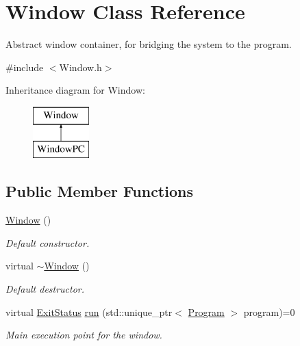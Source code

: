 \hypertarget{class_window}{}\section{Window Class Reference}
\label{class_window}


Abstract window container, for bridging the system to the program.  




{\ttfamily \#include $<$Window.\+h$>$}

Inheritance diagram for Window\+:\begin{figure}[H]
\begin{center}
\leavevmode
\includegraphics[height=2.000000cm]{class_window}
\end{center}
\end{figure}
\subsection*{Public Member Functions}
\begin{DoxyCompactItemize}
\item 
\hyperlink{class_window_a74e6087da23d3c24e9fac0245e5ec92c}{Window} ()
\begin{DoxyCompactList}\small\item\em Default constructor. \end{DoxyCompactList}\item 
virtual \hyperlink{class_window_a245d821e6016fa1f6970ccbbedd635f6}{$\sim$\+Window} ()
\begin{DoxyCompactList}\small\item\em Default destructor. \end{DoxyCompactList}\item 
virtual \hyperlink{_window_8h_ae189a3c432aa37137a55df8c91c579ed}{Exit\+Status} \hyperlink{class_window_ad98ff66251be5270bdf3fe2e731dec0b}{run} (std\+::unique\+\_\+ptr$<$ \hyperlink{class_program}{Program} $>$ program)=0
\begin{DoxyCompactList}\small\item\em Main execution point for the window. \end{DoxyCompactList}\end{DoxyCompactItemize}
